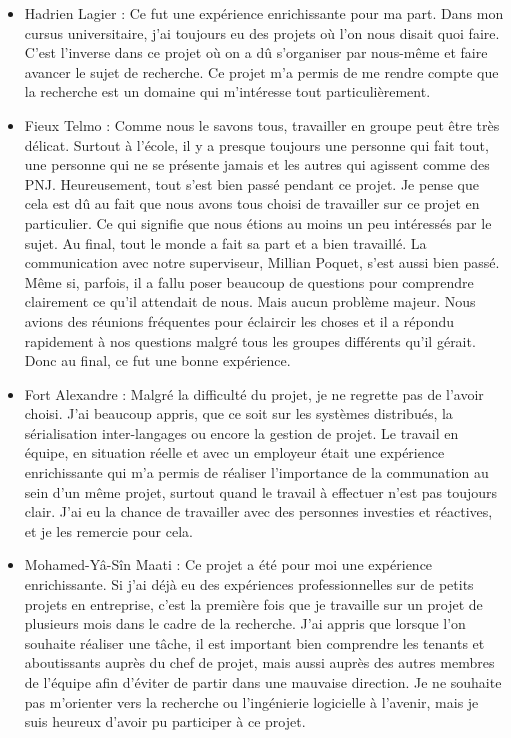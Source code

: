\documentclass{article}
\begin{document}
\begin{itemize}
    \item Hadrien Lagier : Ce fut une expérience enrichissante pour ma part. Dans mon cursus universitaire, j'ai toujours eu des projets où l'on nous disait quoi faire. C'est l'inverse dans ce projet où on a dû s'organiser par nous-même et faire avancer le sujet de recherche. Ce projet m'a permis de me rendre compte que la recherche est un domaine qui m'intéresse tout particulièrement.
    \item Fieux Telmo : Comme nous le savons tous, travailler en groupe peut être très délicat. Surtout à l'école, il y a presque toujours une personne qui fait tout, une personne qui ne se présente jamais et les autres qui agissent comme des PNJ. Heureusement, tout s'est bien passé pendant ce projet. Je pense que cela est dû au fait que nous avons tous choisi de travailler sur ce projet en particulier. Ce qui signifie que nous étions au moins un peu intéressés par le sujet. Au final, tout le monde a fait sa part et a bien travaillé.
    La communication avec notre superviseur, Millian Poquet, s'est aussi bien passé. Même si, parfois, il a fallu poser beaucoup de questions pour comprendre clairement ce qu’il attendait de nous. Mais aucun problème majeur. Nous avions des réunions fréquentes pour éclaircir les choses et il a répondu rapidement à nos questions malgré tous les groupes différents qu'il gérait. Donc au final, ce fut une bonne expérience.
    \item Fort Alexandre : Malgré la difficulté du projet, je ne regrette pas de l'avoir choisi. J'ai beaucoup appris, que ce soit sur les systèmes distribués, la sérialisation inter-langages ou encore la gestion de projet. Le travail en équipe, en situation réelle et avec un employeur était une expérience enrichissante qui m'a permis de réaliser l'importance de la communation au sein d'un même projet, surtout quand le travail à effectuer n'est pas toujours clair. J'ai eu la chance de travailler avec des personnes investies et réactives, et je les remercie pour cela.
    \item Mohamed-Yâ-Sîn Maati : Ce projet a été pour moi une expérience enrichissante. Si j'ai déjà eu des expériences professionnelles sur de petits projets en entreprise, c'est la première fois que je travaille sur un projet de plusieurs mois dans le cadre de la recherche. J'ai appris que lorsque l'on souhaite réaliser une tâche, il est important bien comprendre les tenants et aboutissants auprès du chef de projet, mais aussi auprès des autres membres de l'équipe afin d'éviter de partir dans une mauvaise direction. Je ne souhaite pas m'orienter vers la recherche ou l'ingénierie logicielle à l'avenir, mais je suis heureux d'avoir pu participer à ce projet.

\end{itemize}
\end{document}
